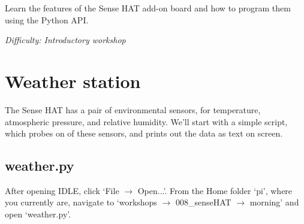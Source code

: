 %
%
%

\newif\ifprint
\printfalse



\newcommand{\workshopTitle}{Workshop 8: Introduction to Sense HAT}

\newcommand{\workshopAuthor}{Jack Kelly}



		
	
	Learn the features of the Sense HAT add-on board and how to program them using the Python API.
	
	\textit{Difficulty: Introductory workshop}
	
	\ifprint
		\renewcommand{\baselinestretch}{0.75}\normalsize
		\tableofcontents
		\renewcommand{\baselinestretch}{1.0}\normalsize
	\else
		\tableofcontents
	\fi
	
	
	
		\clearpage
		
	\section{Weather station}
	
	The Sense HAT has a pair of environmental sensors, for temperature, atmospheric pressure, and relative humidity.
	We'll start with a simple script, which probes on of these sensors, and prints out the data as text on screen.
	
	\subsection*{weather.py}
	
	After opening IDLE, click `File $\rightarrow$ Open...'.
	From the Home folder `pi', where you currently are, navigate to
	`workshops $\rightarrow$ 008\_senseHAT $\rightarrow$ morning'
	and open `weather.py'.
	
